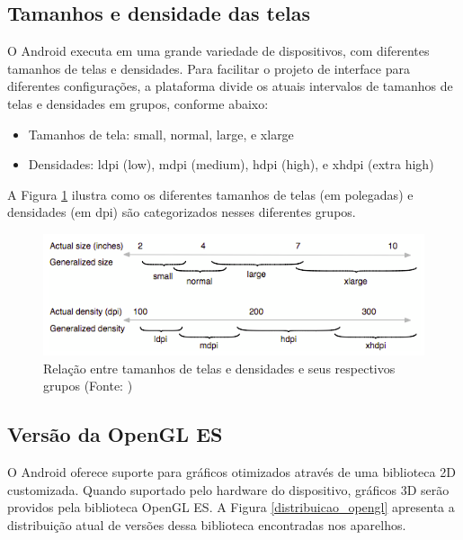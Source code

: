 \subsection{Tamanhos e densidade das telas}

O Android executa em uma grande variedade de dispositivos, com diferentes tamanhos
 de telas e densidades. Para facilitar o projeto de interface para diferentes 
 configurações, a plataforma divide os atuais intervalos de tamanhos de telas e
 densidades em grupos, conforme abaixo:
\begin{itemize}
    \item Tamanhos de tela: small, normal, large, e xlarge
    \item Densidades: ldpi (low), mdpi (medium), hdpi (high), e xhdpi (extra high)
\end{itemize}
 
A Figura \ref{intervalos_telas} ilustra como os diferentes tamanhos de telas 
(em polegadas) e 
densidades (em dpi) são categorizados nesses diferentes grupos.

\begin{figure}[h]
    \centering
    \includegraphics[width=15cm]{img/intervalos_telas}
    \caption[Relação entre tamanhos de telas e densidades e seus respectivos grupos]{Relação entre tamanhos de telas e densidades e seus respectivos grupos 
        (Fonte: \cite{sup_multi_screens}) }
    \label{intervalos_telas}
\end{figure}

\subsection{Versão da OpenGL ES}

O Android oferece suporte para gráficos otimizados através de uma biblioteca 2D 
customizada. Quando suportado pelo hardware do dispositivo, gráficos 3D serão 
providos pela biblioteca OpenGL ES. A Figura \ref{distribuicao_opengl} apresenta 
a distribuição atual de versões dessa biblioteca encontradas nos aparelhos.

